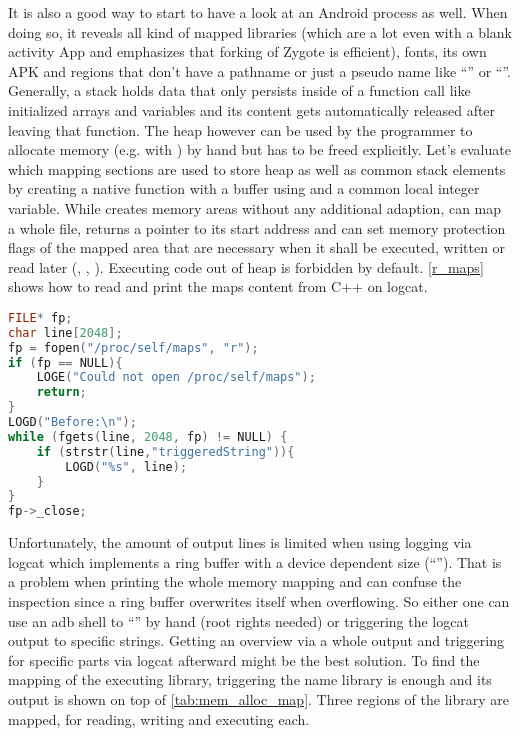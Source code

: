 It is also a good way to start to have a look at an Android process as well.
When doing so, it reveals all kind of mapped libraries (which are a lot even 
with a blank activity App and emphasizes that forking of Zygote is efficient), fonts, its own APK and regions that don't have a pathname or just a pseudo name like
``'' or ``\code{[stack]}''. Generally, a stack holds
data that only persists inside of a function call like initialized arrays and
variables and its content gets automatically released after leaving that function.
The heap however can be used by the programmer to allocate memory
(e.g. with ) by hand but has to be freed explicitly.
Let's evaluate which mapping sections are used to store heap as well as common stack
elements by creating a native function with a buffer using 
and a common local integer variable. While  creates memory areas
without any additional adaption,  can map a whole file, returns a pointer
to its start address and can set memory protection flags of the mapped area that
are necessary when it shall be executed, written or read later (,
 , ). Executing code out of heap is forbidden by 
 default.
\autoref{r_maps} shows how to read and print the maps content from C++ on logcat.
\begin{lstlisting}[language=C++, caption=Reading /proc/self/maps, label=r_maps]
FILE* fp;
char line[2048];
fp = fopen("/proc/self/maps", "r");
if (fp == NULL){
    LOGE("Could not open /proc/self/maps");
    return;
}
LOGD("Before:\n");
while (fgets(line, 2048, fp) != NULL) {
    if (strstr(line,"triggeredString")){
        LOGD("%s", line);
    }
}
fp->_close;
\end{lstlisting}
Unfortunately, the amount of output lines is limited when using logging via logcat which
implements a ring buffer with a device dependent size (``''). That
is a problem when printing the whole memory mapping and can confuse the inspection 
since a ring buffer overwrites itself when overflowing. So either one can use an
adb shell to ``'' by hand (root rights needed)
or triggering the logcat output to specific strings. Getting an overview via a whole output and triggering for specific parts via logcat afterward might be the best solution. 
To find the mapping of the executing library, triggering the name library is enough
and its output is shown on top of \autoref{tab:mem_alloc_map}. Three regions
of the library are mapped, for reading, writing and executing each.
